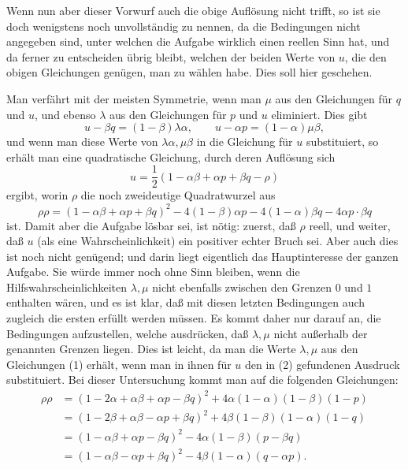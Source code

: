 \documentclass[11pt]{article}
\begin{document}
Wenn nun aber dieser Vorwurf auch die obige Auflösung nicht trifft, so ist sie doch wenigstens noch unvollständig zu nennen, da die Bedingungen nicht angegeben sind, unter welchen die Aufgabe wirklich einen reellen Sinn hat, und da ferner zu entscheiden übrig bleibt, welchen der beiden Werte von $u$, die den obigen Gleichungen genügen, man zu wählen habe. Dies soll hier geschehen.

Man verfährt mit der meisten Symmetrie, wenn man $\mu$ aus den Gleichungen für $q$ und $u$, und ebenso $\lambda$ aus den Gleichungen für $p$ und $u$ eliminiert. Dies gibt
\begin{equation}
u-\beta q=(1-\beta)\lambda\alpha,
\qquad
u-\alpha p=(1-\alpha)\mu\beta,
\tag{1}
\end{equation}
und wenn man diese Werte von $\lambda\alpha,\mu\beta$ in die Gleichung für $u$ substituiert, so erhält man eine quadratische Gleichung, durch deren Auflösung sich
\begin{equation}
u=\frac12(1-\alpha\beta+\alpha p+\beta q-\rho)
\tag{2}
\end{equation}
ergibt, worin $\rho$ die noch zweideutige Quadratwurzel aus
\[
\rho\rho=(1-\alpha\beta+\alpha p+\beta q)^2-4(1-\beta)\alpha p
-4(1-\alpha)\beta q-4\alpha p\cdot\beta q
\]
ist. Damit aber die Aufgabe lösbar sei, ist nötig: zuerst, daß $\rho$ reell, und weiter, daß $u$ (als eine Wahrscheinlichkeit) ein positiver echter Bruch sei. Aber auch dies ist noch nicht genügend; und darin liegt eigentlich das Hauptinteresse der ganzen Aufgabe. Sie würde immer noch ohne Sinn bleiben, wenn die Hilfswahrscheinlichkeiten $\lambda,\mu$ nicht ebenfalls zwischen den Grenzen $0$ und $1$ enthalten wären, und es ist klar, daß mit diesen letzten Bedingungen auch zugleich die ersten erfüllt werden müssen. Es kommt daher nur darauf an, die Bedingungen aufzustellen, welche ausdrücken, daß $\lambda,\mu$ nicht außerhalb der genannten Grenzen liegen. Dies ist leicht, da man die Werte $\lambda,\mu$ aus den Gleichungen (1) erhält, wenn man in ihnen für $u$ den in (2) gefundenen Ausdruck substituiert. Bei dieser Untersuchung kommt man auf die folgenden Gleichungen:
\[
\begin{aligned}
\rho\rho&=(1-2\alpha+\alpha\beta+\alpha p-\beta q)^2
+4\alpha(1-\alpha)(1-\beta)(1-p)\\
&=(1-2\beta+\alpha\beta-\alpha p+\beta q)^2
+4\beta(1-\beta)(1-\alpha)(1-q)\\
&=(1-\alpha\beta+\alpha p-\beta q)^2-4\alpha(1-\beta)(p-\beta q)\\
&=(1-\alpha\beta-\alpha p+\beta q)^2-4\beta(1-\alpha)(q-\alpha p).
\end{aligned}
\]
\end{document}
